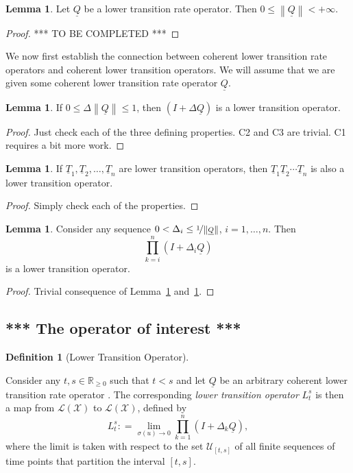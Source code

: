\documentclass[10pt]{paper}
\theoremstyle{definition}
\newtheorem{lemma}[theorem]{Lemma}
\newtheorem{definition}{Definition}
\newcommand{\reals}{\mathbb{R}}
\newcommand{\realsnonneg}{\reals_{\geq 0}}
\newcommand{\states}{\mathcal{X}}
\newcommand{\lt}{\underline{T}}
\newcommand{\lbound}{L}
\newcommand{\gambles}{\mathcal{L}}
\newcommand{\gamblesX}{\gambles(\states)}
\newcommand{\lrate}{\underline{Q}}
\newcommand{\norm}[1]{\left\lVert #1 \right\rVert}
\newcommand{\coloneqq}{:\!=}
\begin{document}
\begin{lemma}\label{lem:normlratefinite}
Let $\lrate$ be a lower transition rate operator. Then $0\leq\norm{\lrate}<+\infty$.
\end{lemma}
\begin{proof}
*** TO BE COMPLETED ***
\end{proof}

We now first establish the connection between coherent lower transition rate operators and coherent lower transition operators. We will assume that we are given some coherent lower transition rate operator $\lrate$.

\begin{lemma}\label{lemma:normQsmallenough}
If $0\leq\Delta\norm{\lrate}\leq1$, then $(I+\Delta\lrate)$ is a lower transition operator.
\end{lemma}
\begin{proof}
Just check each of the three defining properties. C2 and C3 are trivial. C1 requires a bit more work.
\end{proof}

\begin{lemma}\label{lemma:compositioncoherence}
If $\lt_1,\lt_2,\dots,\lt_n$ are lower transition operators, then  $\lt_1\lt_2\cdots\lt_n$ is also a lower transition operator.
\end{lemma}
\begin{proof}
Simply check each of the properties.
\end{proof}

\begin{lemma}\label{lemma:productiscoherent}
Consider any sequence $0<\Delta_i\leq\nicefrac{1}{\norm{\lrate}}$, $i=1,\dots,n$. Then
\begin{equation*}
\prod_{k=i}^n(I+\Delta_i\lrate)
\end{equation*}
is a lower transition operator.
\end{lemma}
\begin{proof}
Trivial consequence of Lemma~\ref{lemma:normQsmallenough} and~\ref{lemma:compositioncoherence}.
\end{proof}

\subsection{*** The operator of interest ***}

\begin{definition}[Lower Transition Operator]\label{def:low_trans}

Consider any $t,s\in\realsnonneg$ such that $t<s$ and let $\lrate$ be an arbitrary coherent lower transition rate operator . The corresponding \emph{lower transition operator} $\lbound_t^s$ is then a map from $\gamblesX$ to $\gamblesX$, defined by
\begin{equation}\label{eq:lowerbound}
\lbound_t^s\coloneqq\lim_{\sigma(u)\to0}\prod_{k=1}^n(I+\Delta_k\lrate),
\end{equation}
where the limit is taken with respect to the set $\mathcal{U}_{[t,s]}$ of all finite sequences of time points that partition the interval $[t,s]$.
\end{definition}
\end{document}
